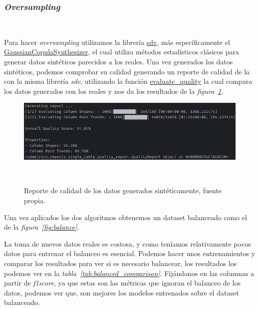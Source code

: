 \subsubsection{\textit{Oversampling}}\ \label{sec:oversampling}

Para hacer \textit{oversampling} utilizamos la librería \href{https://sdv.dev/}{sdv}, más específicamente el 
\href{https://docs.sdv.dev/sdv/single-table-data/modeling/synthesizers/gaussiancopulasynthesizer}{GaussianCopulaSynthesizer}, el cual utiliza métodos estadísticos clásicos para generar datos sintéticos parecidos 
a los reales. Una vez generados los datos sintéticos, podemos comprobar su calidad generando un reporte de calidad de la con la misma librería \textit{sdv}, utilizando la función 
\href{https://docs.sdv.dev/sdv/single-table-data/evaluation#evaluate_quality}{evaluate\_quality} la cual compara los datos generados con los reales y nos da los resultados de la
\textit{figura\ \ref{fig:quality_report}}.

\begin{figure}[!ht]
    \centering
    \includegraphics[width=0.8\linewidth]{media/images/quality_report.png}
    \caption{Reporte de calidad de los datos generados sintéticamente, fuente propia.}\ \label{fig:quality_report}
\end{figure}

Una vez aplicados los dos algoritmos obtenemos un \gls{dataset} balanceado como el de la \textit{figura\ \ref{fig:balance}}.

La toma de nuevos datos reales es costosa, y como teníamos relativamente pocos datos para entrenar el balanceo es esencial. Podemos hacer unos entrenamientos y comparar los resultados para ver si es necesario 
balancear, los resultados los podemos ver en la \textit{tabla\ \ref{tab:balanced_comparison}}. Fijándonos en las columnas a partir de \textit{f1score}, ya que estas son las métricas que ignoran el balanceo de 
los datos, podemos ver que, son mejores los modelos entrenados sobre el \gls{dataset} balanceado.

